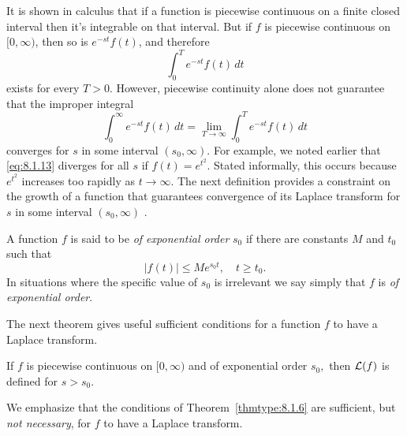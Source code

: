 \documentclass{ximera}
\begin{document}


It is shown in calculus that if a function is piecewise continuous on
a finite closed interval then it's integrable on that interval. But
if $f$ is piecewise continuous on $[0,\infty)$, then so is $e^{-st}f
(t)$, and therefore
$$
\int_0^T e^{-st}f(t)\,dt
$$
exists for every $T>0$. However, piecewise continuity alone does not
guarantee that the improper integral
\begin{equation}\label{eq:8.1.13}
\int_0^\infty e^{-st}f(t)\,dt=\lim_{T\rightarrow\infty}\int_0^T e^{-st}f(t)\,
dt
\end{equation}
converges for $s$ in some interval $(s_0,\infty)$. For example, we
noted earlier that \eqref{eq:8.1.13} diverges for all $s$ if
$f(t)=e^{t^2}$. Stated informally, this occurs because $e^{t^2}$
increases too rapidly as $t\rightarrow\infty$. The next definition
provides a constraint on the growth of a function that guarantees
convergence of its Laplace transform for $s$ in some interval
$(s_0,\infty)$ .

\begin{definition}\label{thmtype:8.1.5} A
function $f$ is said to be
\textit{of exponential order} $s_0$ if there are constants $M$ and $t_0$
such that
\begin{equation}\label{eq:8.1.14}
|f(t)|\leq Me^{s_0t},\quad t\geq t_0.
\end{equation}
In situations where the specific value of $s_0$
is irrelevant we say simply that $f$ is \textit{of exponential order}.
\end{definition}

The next theorem gives useful sufficient conditions for a function $f$
to have a Laplace transform.  

\begin{theorem}\label{thmtype:8.1.6} If $f$
is piecewise continuous on $[0,\infty)$ and of exponential order $s_0,$
 then ${\cal L}(f)$ is defined for $s>s_0$.
\end{theorem}

\begin{remark}
We emphasize that the conditions of Theorem~\ref{thmtype:8.1.6}
 are sufficient, but \textit{not necessary}, for $f$ to have a Laplace transform. 
\end{remark}
\end{document}
